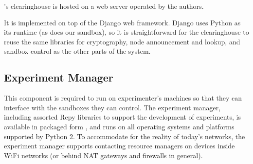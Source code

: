 \sysname's clearinghouse is hosted on a web server operated by the 
authors. 

It is implemented on top of the Django web framework. 
Django uses Python as its runtime (as does our sandbox), so it is 
straightforward for the clearinghouse to reuse the same libraries for 
cryptography, node announcement and lookup, and sandbox control as the 
other parts of the system.



\subsection{Experiment Manager}

This component is required to run on experimenter's machines so that 
they can interface with the sandboxes they can control. The experiment 
manager, including assorted Repy libraries to support the development of 
experiments, is available in packaged form \cite{demo-kit}, and runs 
on all operating systems and platforms supported by Python 2. 
To accommodate for the reality of today's networks, the experiment 
manager supports contacting resource managers on devices 
inside WiFi networks (or behind NAT gateways and firewalls in general).
